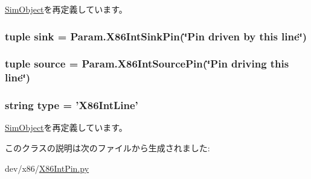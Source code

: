 \hyperlink{classm5_1_1SimObject_1_1SimObject_a17da7064bc5c518791f0c891eff05fda}{SimObject}を再定義しています。\hypertarget{classX86IntPin_1_1X86IntLine_ad1dc9221fe6891d39e79ea933df9ff9e}{
\subsubsection[{sink}]{\setlength{\rightskip}{0pt plus 5cm}tuple {\bf sink} = Param.X86IntSinkPin(\char`\"{}Pin driven by this line\char`\"{})}}
\label{classX86IntPin_1_1X86IntLine_ad1dc9221fe6891d39e79ea933df9ff9e}
\hypertarget{classX86IntPin_1_1X86IntLine_aa873026052cc3e5ba03877243fcb7ecd}{
\subsubsection[{source}]{\setlength{\rightskip}{0pt plus 5cm}tuple {\bf source} = Param.X86IntSourcePin(\char`\"{}Pin driving this line\char`\"{})}}
\label{classX86IntPin_1_1X86IntLine_aa873026052cc3e5ba03877243fcb7ecd}
\hypertarget{classX86IntPin_1_1X86IntLine_acce15679d830831b0bbe8ebc2a60b2ca}{
\subsubsection[{type}]{\setlength{\rightskip}{0pt plus 5cm}string {\bf type} = '{\bf X86IntLine}'}}
\label{classX86IntPin_1_1X86IntLine_acce15679d830831b0bbe8ebc2a60b2ca}


\hyperlink{classm5_1_1SimObject_1_1SimObject_acce15679d830831b0bbe8ebc2a60b2ca}{SimObject}を再定義しています。

このクラスの説明は次のファイルから生成されました:\begin{DoxyCompactItemize}
\item 
dev/x86/\hyperlink{X86IntPin_8py}{X86IntPin.py}\end{DoxyCompactItemize}
